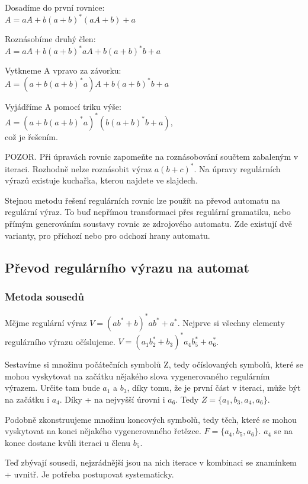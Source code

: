 \documentclass{article}
\begin{document}
Dosadíme do první rovnice:\\
$A = aA + b(a + b)^* (aA + b) + a$

Roznásobíme druhý člen:\\
$A = aA + b(a + b)^* aA + b(a + b)^* b + a$

Vytkneme A vpravo za závorku:\\
$A = (a + b(a + b)^* a)A + b(a + b)^* b + a$

Vyjádříme A pomocí triku výše:\\
$A = (a + b(a + b)^* a)^* (b(a + b)^* b + a)$,\\
což je řešením.

POZOR. Při úpravách rovnic zapomeňte na roznásobování součtem zabaleným v iteraci. Rozhodně nelze roznásobit výraz 
$a (b+c)^*$. Na úpravy regulárních výrazů existuje kuchařka, kterou najdete ve slajdech.

Stejnou metodu řešení regulárních rovnic lze použít na převod automatu na regulární výraz. To buď nepřímou transformaci přes regulární gramatiku, nebo přímým generováním soustavy rovnic ze zdrojového automatu. Zde existují dvě varianty, pro příchozí nebo pro odchozí hrany automatu.

\subsection{Převod regulárního výrazu na automat}
\subsubsection{Metoda sousedů}

Mějme regulární výraz $V = (ab^* + b)^* ab^* + a^*$.
Nejprve si všechny elementy regulárního výrazu očíslujeme.
$V = (a_1b_2^* + b_3)^* a_4b_5^* + a_6^*$.

Sestavíme si množinu počátečních symbolů Z, tedy očíslovaných symbolů, které se mohou vyskytovat na začátku nějakého slova vygenerovaného regulárním výrazem.
Určite tam bude $a_1$ a $b_3$, díky tomu, že je první část v iteraci, může být na začátku i $a_4$. Díky + na nejvyšší úrovni i $a_6$.
Tedy $Z = \{a_1, b_3, a_4, a_6\}$.

Podobně zkonstruujeme množinu koncových symbolů, tedy těch, které se mohou vyskytovat na konci nějakého vygenerovaného řetězce.
$F = \{a_4, b_5, a_6\}$. $a_4$ se na konec dostane kvůli iteraci u členu $b_5$.

Teď zbývají sousedi, nejzrádnější jsou na nich iterace v kombinaci se znamínkem + uvnitř. Je potřeba postupovat systematicky.
\end{document}
